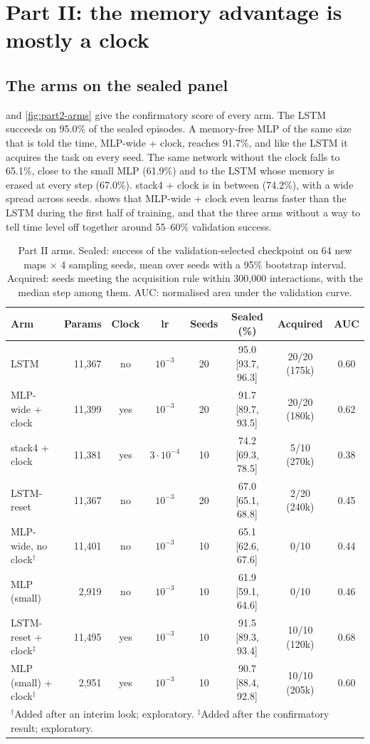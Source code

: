 \section{Part II: the memory advantage is mostly a clock}
\label{sec:part2}

\subsection{The arms on the sealed panel}
\label{sec:part2-arms}

 and \cref{fig:part2-arms} give the confirmatory score of every arm. The LSTM
succeeds on 95.0\% of the sealed episodes. A memory-free MLP of the same size that is told the
time, MLP-wide + clock, reaches 91.7\%, and like the LSTM it acquires the task on every seed. The
same network without the clock falls to 65.1\%, close to the small MLP (61.9\%) and to the LSTM
whose memory is erased at every step (67.0\%). stack4 + clock is in between (74.2\%), with a wide
spread across seeds.  shows that MLP-wide + clock even learns faster than
the LSTM during the first half of training, and that the three arms without a way to tell time
level off together around 55--60\% validation success.

\begin{table}[t]
  \centering
  \caption{Part II arms. Sealed: success of the validation-selected checkpoint on 64 new maps
  $\times$ 4 sampling seeds, mean over seeds with a 95\% bootstrap interval. Acquired: seeds
  meeting the acquisition rule within 300,000 interactions, with the median step among them.
  AUC: normalised area under the validation curve.}
  \label{tab:arms}
  \small
  \begin{tabular}{lrcccccc}
    \toprule
    Arm & Params & Clock & lr & Seeds & Sealed (\%) & Acquired & AUC \\
    \midrule
    LSTM & 11,367 & no & $10^{-3}$ & 20 & 95.0 [93.7, 96.3] & 20/20 (175k) & 0.60 \\
    MLP-wide + clock & 11,399 & yes & $10^{-3}$ & 20 & 91.7 [89.7, 93.5] & 20/20 (180k) & 0.62 \\
    stack4 + clock & 11,381 & yes & $3\cdot10^{-4}$ & 10 & 74.2 [69.3, 78.5] & 5/10 (270k) & 0.38 \\
    LSTM-reset & 11,367 & no & $10^{-3}$ & 20 & 67.0 [65.1, 68.8] & 2/20 (240k) & 0.45 \\
    MLP-wide, no clock$^\dagger$ & 11,401 & no & $10^{-3}$ & 10 & 65.1 [62.6, 67.6] & 0/10 & 0.44 \\
    MLP (small) & 2,919 & no & $10^{-3}$ & 10 & 61.9 [59.1, 64.6] & 0/10 & 0.46 \\
    \midrule
    LSTM-reset + clock$^\ddagger$ & 11,495 & yes & $10^{-3}$ & 10 & 91.5 [89.3, 93.4] & 10/10 (120k) & 0.68 \\
    MLP (small) + clock$^\ddagger$ & 2,951 & yes & $10^{-3}$ & 10 & 90.7 [88.4, 92.8] & 10/10 (205k) & 0.60 \\
    \bottomrule
    \multicolumn{8}{l}{\footnotesize $^\dagger$Added after an interim look; exploratory.
    $^\ddagger$Added after the confirmatory result; exploratory.}
  \end{tabular}
\end{table}

